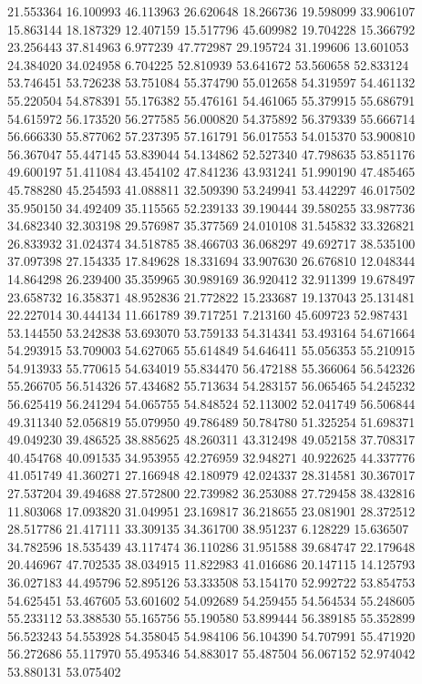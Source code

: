 21.553364
16.100993
46.113963
26.620648
18.266736
19.598099
33.906107
15.863144
18.187329
12.407159
15.517796
45.609982
19.704228
15.366792
23.256443
37.814963
6.977239
47.772987
29.195724
31.199606
13.601053
24.384020
34.024958
6.704225
52.810939
53.641672
53.560658
52.833124
53.746451
53.726238
53.751084
55.374790
55.012658
54.319597
54.461132
55.220504
54.878391
55.176382
55.476161
54.461065
55.379915
55.686791
54.615972
56.173520
56.277585
56.000820
54.375892
56.379339
55.666714
56.666330
55.877062
57.237395
57.161791
56.017553
54.015370
53.900810
56.367047
55.447145
53.839044
54.134862
52.527340
47.798635
53.851176
49.600197
51.411084
43.454102
47.841236
43.931241
51.990190
47.485465
45.788280
45.254593
41.088811
32.509390
53.249941
53.442297
46.017502
35.950150
34.492409
35.115565
52.239133
39.190444
39.580255
33.987736
34.682340
32.303198
29.576987
35.377569
24.010108
31.545832
33.326821
26.833932
31.024374
34.518785
38.466703
36.068297
49.692717
38.535100
37.097398
27.154335
17.849628
18.331694
33.907630
26.676810
12.048344
14.864298
26.239400
35.359965
30.989169
36.920412
32.911399
19.678497
23.658732
16.358371
48.952836
21.772822
15.233687
19.137043
25.131481
22.227014
30.444134
11.661789
39.717251
7.213160
45.609723
52.987431
53.144550
53.242838
53.693070
53.759133
54.314341
53.493164
54.671664
54.293915
53.709003
54.627065
55.614849
54.646411
55.056353
55.210915
54.913933
55.770615
54.634019
55.834470
56.472188
55.366064
56.542326
55.266705
56.514326
57.434682
55.713634
54.283157
56.065465
54.245232
56.625419
56.241294
54.065755
54.848524
52.113002
52.041749
56.506844
49.311340
52.056819
55.079950
49.786489
50.784780
51.325254
51.698371
49.049230
39.486525
38.885625
48.260311
43.312498
49.052158
37.708317
40.454768
40.091535
34.953955
42.276959
32.948271
40.922625
44.337776
41.051749
41.360271
27.166948
42.180979
42.024337
28.314581
30.367017
27.537204
39.494688
27.572800
22.739982
36.253088
27.729458
38.432816
11.803068
17.093820
31.049951
23.169817
36.218655
23.081901
28.372512
28.517786
21.417111
33.309135
34.361700
38.951237
6.128229
15.636507
34.782596
18.535439
43.117474
36.110286
31.951588
39.684747
22.179648
20.446967
47.702535
38.034915
11.822983
41.016686
20.147115
14.125793
36.027183
44.495796
52.895126
53.333508
53.154170
52.992722
53.854753
54.625451
53.467605
53.601602
54.092689
54.259455
54.564534
55.248605
55.233112
53.388530
55.165756
55.190580
53.899444
56.389185
55.352899
56.523243
54.553928
54.358045
54.984106
56.104390
54.707991
55.471920
56.272686
55.117970
55.495346
54.883017
55.487504
56.067152
52.974042
53.880131
53.075402
